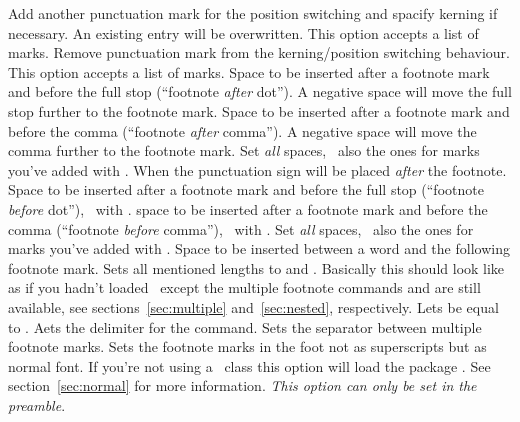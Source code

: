 \documentclass[load-preamble+]{cnltx-doc}
\begin{document}
\begin{options}
    Add another punctuation mark for the position switching and spacify
    kerning if necessary.  An existing entry will be overwritten.  This option
    accepts a list of marks.
    Remove punctuation mark from the kerning/position switching behaviour.
    This option accepts a list of marks.
  \Default{-.06em}
    Space to be inserted after a footnote mark and before the full stop
    (``footnote \emph{after} dot'').  A negative space will move the full stop
    further to the footnote mark.
  \Default{-.06em}
    Space to be inserted after a footnote mark and before the comma
    (``footnote \emph{after} comma'').  A negative space will move the comma
    further to the footnote mark.
    Set \emph{all} spaces, \ie\ also the ones for marks you've added with
    .
    When  the punctuation sign will be placed \emph{after} the
    footnote.
  \Default{-.16em}
    Space to be inserted after a footnote mark and before the full stop
    (``footnote \emph{before} dot''), \ie\ with .
  \Default{-.16em}
    space to be inserted after a footnote mark and before the comma
    (``footnote \emph{before} comma''), \ie\ with .
    Set \emph{all} spaces, \ie\ also the ones for marks you've added with
    .
  \Default{.06em}
    Space to be inserted between a word and the following footnote mark.
    Sets all mentioned lengths to \code{0pt} and .
    Basically this should look like as if you hadn't loaded \fnpct\ except the
    multiple footnote commands and  are still available, see
    sections~\ref{sec:multiple} and~\ref{sec:nested}, respectively.
    Lets  be equal to .
  \Default{;}
    Aets the delimiter for the  command.
  \Default{,}
    Sets the separator between multiple footnote marks.
    Sets the footnote marks in the foot not as superscripts but as normal
    font.  If you're not using a \KOMAScript\ class this option will load
    the package .  See section~\ref{sec:normal} for more
    information.  \emph{This option can only be set in the preamble}.
\end{options}
\end{document}
